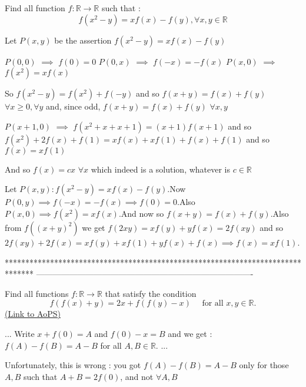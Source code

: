 \begin{solution}
	\begin{tcolorbox}Find all function $f:\mathbb{R}\rightarrow \mathbb{R}$ such that :
\[f\left ( x^2-y \right )=xf(x)-f(y), \forall x,y \in \mathbb{R}\]\end{tcolorbox}
Let $P(x,y)$ be the assertion $f(x^2-y)=xf(x)-f(y)$

$P(0,0)$ $\implies$ $f(0)=0$
$P(0,x)$ $\implies$ $f(-x)=-f(x)$
$P(x,0)$ $\implies$ $f(x^2)=xf(x)$

So $f(x^2-y)=f(x^2)+f(-y)$ and so $f(x+y)=f(x)+f(y)$ $\forall x\ge 0,\forall y$ and, since odd, $f(x+y)=f(x)+f(y)$ $\forall x,y$

$P(x+1,0)$ $\implies$ $f(x^2+x+x+1)=(x+1)f(x+1)$ and so $f(x^2)+2f(x)+f(1)=xf(x)+xf(1)+f(x)+f(1)$ and so $f(x)=xf(1)$

And so $\boxed{f(x)=cx}$ $\forall x$ which indeed is a solution, whatever is $c\in\mathbb R$
\end{solution}



\begin{solution}
	Let $P(x,y):f(x^2-y)=xf(x)-f(y)$.Now $P(0,y)\implies f(-x)=-f(x)\implies f(0)=0$.Also $P(x,0)\implies f(x^2)=xf(x)$.And now so $f(x+y)=f(x)+f(y)$.Also from $f((x+y)^2)$ we get $f(2xy)=xf(y)+yf(x)=2f(xy)$ and so $2f(xy)+2f(x)=xf(y)+xf(1)+yf(x)+f(x)\implies f(x)=xf(1)$.
\end{solution}
*******************************************************************************
-------------------------------------------------------------------------------

\begin{problem}
	Find all functions $f : \mathbb{R} \to \mathbb{R}$ that satisfy the condition
\[f(f(x) + y) = 2x + f(f(y) - x)\quad \text{ for all } x, y \in\mathbb{R}.\]
	\flushright \href{https://artofproblemsolving.com/community/c6h531830}{(Link to AoPS)}
\end{problem}



\begin{solution}
	\begin{tcolorbox}...
Write $x+f(0)=A$ and $f(0)-x=B$ and we get : $f(A) - f(B) = A - B$ for all $A, B \in \mathbb{R}$.
...\end{tcolorbox}
Unfortunately, this is wrong : you got $f(A)-f(B)=A-B$ only for those $A,B$ such that $A+B=2f(0)$, and not $\forall A,B$
\end{solution}



